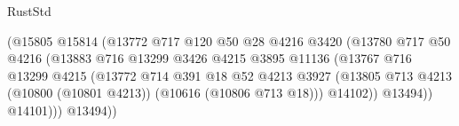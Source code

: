 \begin{lexlean}{RustStd}
\begin{coremodule}
                                                  (@15805
                                                    @15814
                                                    (@13772
                                                      @717
                                                      @120
                                                      @50
                                                      @28
                                                      @4216
                                                      @3420
                                                      (@13780
                                                        @717
                                                        @50
                                                        @4216
                                                        (@13883
                                                          @716
                                                          @13299
                                                          @3426
                                                          @4215
                                                          @3895
                                                          @11136
                                                          (@13767
                                                            @716
                                                            @13299
                                                            @4215
                                                            (@13772
                                                              @714
                                                              @391
                                                              @18
                                                              @52
                                                              @4213
                                                              @3927
                                                              (@13805
                                                                @713
                                                                @4213
                                                                (@10800 (@10801 @4213))
                                                                (@10616 (@10806 @713 @18)))
                                                              @14102))
                                                          @13494))
                                                      @14101)))
                                                @13494))

\end{coremodule}
\end{lexlean}

